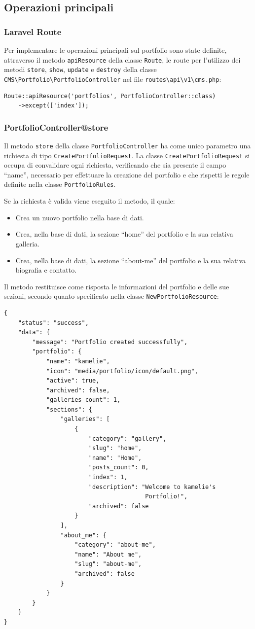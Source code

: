 \subsection{Operazioni principali}
\subsubsection{Laravel Route}
Per implementare le operazioni principali sul portfolio sono state definite, attraverso il metodo \verb|apiResource| della classe \verb|Route|, le route per l'utilizzo dei metodi \verb|store|, \verb|show|, \verb|update| e \verb|destroy| della classe \verb|CMS\Portfolio\PortfolioController| nel file \verb|routes\api\v1\cms.php|:
\begin{lstlisting}[caption={Route per le operazioni principali sul portfolio}, label={lst:route_logout}]
Route::apiResource('portfolios', PortfolioController::class)
	->except(['index']);
\end{lstlisting}

\subsubsection{PortfolioController@store}
Il metodo \verb|store| della classe \verb|PortfolioController| ha come unico parametro una richiesta di tipo \verb|CreatePortfolioRequest|. La classe \verb|CreatePortfolioRequest| si occupa di convalidare ogni richiesta, verificando che sia presente il campo ``name'', necessario per effettuare la creazione del portfolio e che rispetti le regole definite nella classe \verb|PortfolioRules|. 

Se la richiesta \`e valida viene eseguito il metodo, il quale:
\begin{itemize}
	\item Crea un nuovo portfolio nella base di dati.
	\item Crea, nella base di dati, la sezione ``home'' del portfolio e la sua relativa galleria.
	\item Crea, nella base di dati, la sezione ``about-me'' del portfolio e la sua relativa biografia e contatto.
\end{itemize} 

Il metodo restituisce come risposta le informazioni del portfolio e delle sue sezioni, secondo quanto specificato nella classe \verb|NewPortfolioResource|: 
	
\begin{lstlisting}[caption={Risposta di successo creazione del portfolio}, label={lst:response_success_portfolio}, tabsize=3]
{
	"status": "success",
	"data": {
		"message": "Portfolio created successfully",
		"portfolio": {
			"name": "kamelie",
			"icon": "media/portfolio/icon/default.png",
			"active": true,
			"archived": false,
			"galleries_count": 1,
			"sections": {
				"galleries": [
					{
						"category": "gallery",
						"slug": "home",
						"name": "Home",
						"posts_count": 0,
						"index": 1,
						"description": "Welcome to kamelie's
										Portfolio!",
						"archived": false
					}
				],
				"about_me": {
					"category": "about-me",
					"name": "About me",
					"slug": "about-me",
					"archived": false
				}
			}
		}
	}
}
\end{lstlisting}

